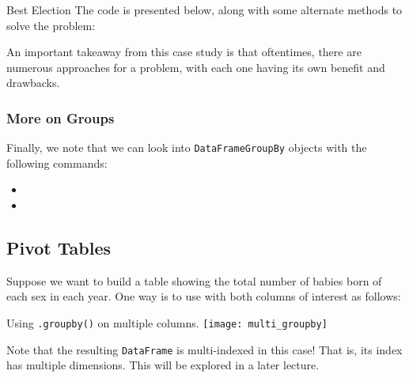 \documentclass[openany]{book}
\begin{document}
\begin{casestudy*}[parbox=false]{Best Election}{}
	The code is presented below, along with some alternate methods to solve the problem:

An important takeaway from this case study is that oftentimes, there are numerous approaches for a problem, with each one having its own benefit and drawbacks.
\end{casestudy*}

\subsubsection{More on Groups}
Finally, we note that we can look into \texttt{DataFrameGroupBy} objects with the following commands:
\begin{itemize}
	\item {}
	\item {}
\end{itemize}

\subsection{Pivot Tables}
Suppose we want to build a table showing the total number of babies born of each sex in each year. One way is to use  with both columns of interest as follows:
\begin{center}
\end{center}
\begin{figurebox}[]{Using \texttt{.groupby()} on multiple columns.}
	\centering\texttt{[image: multi\_groupby]}
\end{figurebox}
\begin{warn}
	Note that the resulting \texttt{DataFrame} is multi-indexed in this case! That is, its index has multiple dimensions. This will be explored in a later lecture.
\end{warn}
\end{document}
